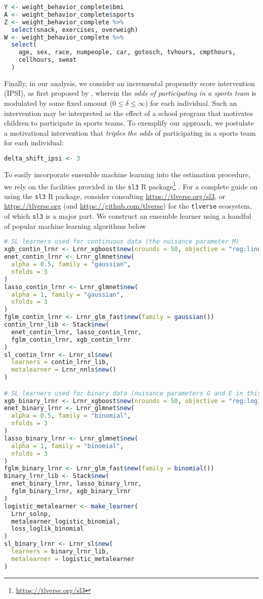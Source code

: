 \documentclass[
  12pt,
]{book}
\newcommand{\passthrough}[1]{#1}
\renewcommand{\href}[2]{#2\footnote{\url{#1}}}
\theoremstyle{definition}
\theoremstyle{definition}
\theoremstyle{definition}
\newcommand{\1}{\mathbbm{1}}
\begin{document}
\begin{lstlisting}[language=R]
Y <- weight_behavior_complete$bmi
A <- weight_behavior_complete$sports
Z <- weight_behavior_complete %>%
  select(snack, exercises, overweigh)
W <- weight_behavior_complete %>%
  select(
    age, sex, race, numpeople, car, gotosch, tvhours, cmpthours,
    cellhours, sweat
  )
\end{lstlisting}

Finally, in our analysis, we consider an incremental propensity score
intervention (IPSI), as first proposed by \citet{kennedy2017nonparametric}, wherein the
\emph{odds of participating in a sports team} is modulated by some fixed amount
(\(0 \leq \delta \leq \infty\)) for each individual. Such an intervention may be
interpreted as the effect of a school program that motivates children to
participate in sports teams. To exemplify our approach, we postulate a
motivational intervention that \emph{triples the odds} of participating in a sports
team for each individual:

\begin{lstlisting}[language=R]
delta_shift_ipsi <- 3
\end{lstlisting}

To easily incorporate ensemble machine learning into the estimation procedure,
we rely on the facilities provided in the \href{https://tlverse.org/sl3}{\passthrough{\lstinline!sl3!} R
package} \citep{coyle2020sl3}. For a complete guide on using
the \passthrough{\lstinline!sl3!} R package, consider consulting \url{https://tlverse.org/sl3}, or
\url{https://tlverse.org} (and \url{https://github.com/tlverse}) for the \passthrough{\lstinline!tlverse!}
ecosystem, of which \passthrough{\lstinline!sl3!} is a major part. We construct an ensemble learner
using a handful of popular machine learning algorithms below

\begin{lstlisting}[language=R]
# SL learners used for continuous data (the nuisance parameter M)
xgb_contin_lrnr <- Lrnr_xgboost$new(nrounds = 50, objective = "reg:linear")
enet_contin_lrnr <- Lrnr_glmnet$new(
  alpha = 0.5, family = "gaussian",
  nfolds = 3
)
lasso_contin_lrnr <- Lrnr_glmnet$new(
  alpha = 1, family = "gaussian",
  nfolds = 3
)
fglm_contin_lrnr <- Lrnr_glm_fast$new(family = gaussian())
contin_lrnr_lib <- Stack$new(
  enet_contin_lrnr, lasso_contin_lrnr,
  fglm_contin_lrnr, xgb_contin_lrnr
)
sl_contin_lrnr <- Lrnr_sl$new(
  learners = contin_lrnr_lib,
  metalearner = Lrnr_nnls$new()
)

# SL learners used for binary data (nuisance parameters G and E in this case)
xgb_binary_lrnr <- Lrnr_xgboost$new(nrounds = 50, objective = "reg:logistic")
enet_binary_lrnr <- Lrnr_glmnet$new(
  alpha = 0.5, family = "binomial",
  nfolds = 3
)
lasso_binary_lrnr <- Lrnr_glmnet$new(
  alpha = 1, family = "binomial",
  nfolds = 3
)
fglm_binary_lrnr <- Lrnr_glm_fast$new(family = binomial())
binary_lrnr_lib <- Stack$new(
  enet_binary_lrnr, lasso_binary_lrnr,
  fglm_binary_lrnr, xgb_binary_lrnr
)
logistic_metalearner <- make_learner(
  Lrnr_solnp,
  metalearner_logistic_binomial,
  loss_loglik_binomial
)
sl_binary_lrnr <- Lrnr_sl$new(
  learners = binary_lrnr_lib,
  metalearner = logistic_metalearner
)
\end{lstlisting}
\end{document}
